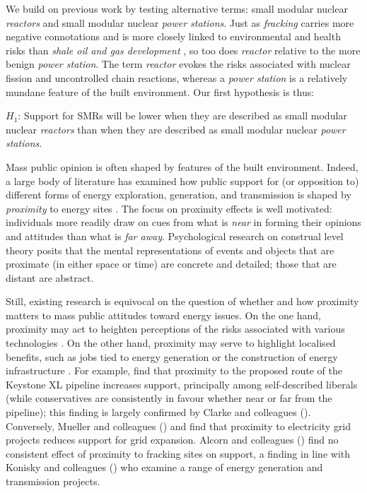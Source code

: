 \documentclass[a4paper, 11pt]{article}
\begin{document}
We build on previous work by testing alternative terms: small modular nuclear \emph{reactors} and small modular nuclear \emph{power stations}. Just as \emph{fracking} carries more negative connotations and is more closely linked to environmental and health risks than \emph{shale oil and gas development} \citep{clarke2015}, so too does \emph{reactor} relative to the more benign \emph{power station}. The term \emph{reactor} evokes the risks associated with nuclear fission and uncontrolled chain reactions, whereas a \emph{power station} is a relatively mundane feature of the built environment. Our first hypothesis is thus:

$H_1$: Support for SMRs will be lower when they are described as small modular nuclear \emph{reactors} than when they are described as small modular nuclear \emph{power stations}.

Mass public opinion is often shaped by features of the built environment. Indeed, a large body of literature has examined how public support for (or opposition to) different forms of energy exploration, generation, and transmission is shaped by \emph{proximity} to energy sites \citep[see, e.g.,][]{aldrich2013,boudet2018,clarke2016,evensen2016,gravelle2015,konisky2020,latre2017,mueller2019,mueller2017}. The focus on proximity effects is well motivated: individuals more readily draw on cues from what is \emph{near} in forming their opinions and attitudes than what is \emph{far away}. Psychological research on construal level theory \citep{fujita2006,henderson2006,trope2007,trope_liberman2010} posits that the mental representations of events and objects that are proximate (in either space or time) are concrete and detailed; those that are distant are abstract.

Still, existing research is equivocal on the question of whether and how proximity matters to mass public attitudes toward energy issues. On the one hand, proximity may act to heighten perceptions of the risks associated with various technologies \citep{boudet2018,venables2012}. On the other hand, proximity may serve to highlight localised benefits, such as jobs tied to energy generation or the construction of energy infrastructure \citep{aldrich2013,gravelle2015}. For example, \citet{gravelle2015} find that proximity to the proposed route of the Keystone XL pipeline increases support, principally among self-described liberals (while conservatives are consistently in favour whether near or far from the pipeline); this finding is largely confirmed by Clarke and colleagues (\citeyear{clarke2016}). Conversely, Mueller and colleagues (\citeyear{mueller2017}) and \citet{mueller2019} find that proximity to electricity grid projects reduces support for grid expansion. Alcorn and colleagues (\citeyear{alcorn2017}) find no consistent effect of proximity to fracking sites on support, a finding in line with Konisky and colleagues (\citeyear{konisky2020}) who examine a range of energy generation and transmission projects.
\end{document}
